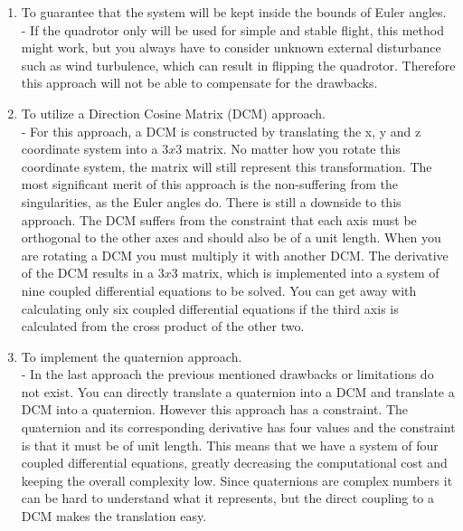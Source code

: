 \begin{enumerate}
    \item To guarantee that the system will be kept inside the bounds of Euler angles. \\
    - If the quadrotor only will be used for simple and stable flight, this method might work, but you always have to consider unknown external disturbance such as wind turbulence, which can result in flipping the quadrotor. Therefore this approach will not be able to compensate for the drawbacks. 
    \item To utilize a Direction Cosine Matrix (DCM) approach.\\
    - For this approach, a DCM is constructed by translating the x, y and z coordinate system into a $3x3$ matrix. No matter how you rotate this coordinate system, the matrix will still represent this transformation. The most significant merit of this approach is the non-suffering from the singularities, as the Euler angles do. There is still a downside to this approach. The DCM suffers from the constraint that each axis must be orthogonal to the other axes and should also be of a unit length. When you are rotating a DCM you must multiply it with another DCM. The derivative of the DCM results in a $3x3$ matrix, which is implemented into a system of nine coupled differential equations to be solved. You can get away with calculating only six coupled differential equations if the third axis is calculated from the cross product of the other two. 
    \item To implement the quaternion approach. \\
    - In the last approach the previous mentioned drawbacks or limitations do not exist. You can directly translate a quaternion into a DCM and translate a DCM into a quaternion. However this approach has a constraint. The quaternion and its corresponding derivative has four values and the constraint is that it must be of unit length. This means that we have a system of four coupled differential equations, greatly decreasing the computational cost and keeping the overall complexity low. Since quaternions are complex numbers it can be hard to understand what it represents, but the direct coupling to a DCM makes the translation easy. 
\end{enumerate}

